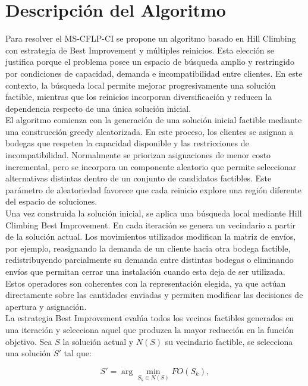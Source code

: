 \section{Descripción del Algoritmo}

\noindent Para resolver el MS-CFLP-CI se propone un algoritmo basado en Hill Climbing con estrategia de Best Improvement y múltiples reinicios. Esta elección se justifica porque el problema posee un espacio de búsqueda amplio y restringido por condiciones de capacidad, demanda e incompatibilidad entre clientes. En este contexto, la búsqueda local permite mejorar progresivamente una solución factible, mientras que los reinicios incorporan diversificación y reducen la dependencia respecto de una única solución inicial.\\

\noindent El algoritmo comienza con la generación de una solución inicial factible mediante una construcción greedy aleatorizada. En este proceso, los clientes se asignan a bodegas que respeten la capacidad disponible y las restricciones de incompatibilidad. Normalmente se priorizan asignaciones de menor costo incremental, pero se incorpora un componente aleatorio que permite seleccionar alternativas distintas dentro de un conjunto de candidatos factibles. Este parámetro de aleatoriedad favorece que cada reinicio explore una región diferente del espacio de soluciones.\\

\noindent Una vez construida la solución inicial, se aplica una búsqueda local mediante Hill Climbing Best Improvement. En cada iteración se genera un vecindario a partir de la solución actual. Los movimientos utilizados modifican la matriz de envíos, por ejemplo, reasignando la demanda de un cliente hacia otra bodega factible, redistribuyendo parcialmente su demanda entre distintas bodegas o eliminando envíos que permitan cerrar una instalación cuando esta deja de ser utilizada. Estos operadores son coherentes con la representación elegida, ya que actúan directamente sobre las cantidades enviadas y permiten modificar las decisiones de apertura y asignación.\\

\noindent La estrategia Best Improvement evalúa todos los vecinos factibles generados en una iteración y selecciona aquel que produzca la mayor reducción en la función objetivo. Sea \(S\) la solución actual y \(N(S)\) su vecindario factible, se selecciona una solución \(S'\) tal que:

\[
S' = \arg\min_{S_k \in N(S)} FO(S_k),
\]


